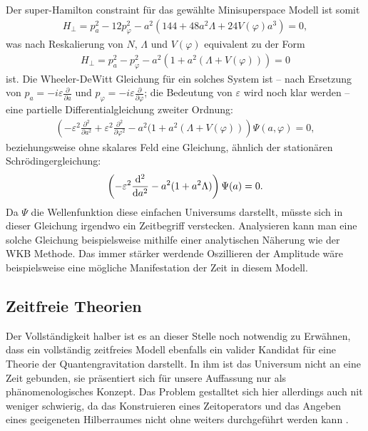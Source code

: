 \documentclass{scrartcl}
\newcommand{\veps}{\varepsilon}
\begin{document}
			Der super-Hamilton constraint für das gewählte Minisuperspace Modell ist somit
			\begin{align}
				H_\perp=p_a^2-12p_\varphi^2-a^2(144+48 a^2 \Lambda+24V(\varphi)a^3)=0,
			\end{align}
			was nach Reskalierung von $N$, $\Lambda$ und $V(\varphi)$ equivalent zu der Form
			\begin{align}
				H_\perp=p_a^2-p_\varphi^2-a^2(1+a^2 (\Lambda+V(\varphi)))=0
			\end{align}
			ist. Die Wheeler-DeWitt Gleichung für ein solches System ist -- nach Ersetzung von $p_a=-i\veps\frac{\partial}{\partial a}$ und $p_\varphi=-i\veps\frac{\partial}{\partial \varphi}$; die Bedeutung von $\veps$ wird noch klar werden -- eine
			partielle Differentialgleichung zweiter Ordnung:
			\begin{align}
				\left(-\veps^2\frac{\partial^2}{\partial a^2}+\veps^2\frac{\partial^2}{\partial \varphi^2}-a^2(1+a^2 (\Lambda+V(\varphi))\right)\Psi(a,\varphi)=0,
			\end{align}
			beziehungsweise ohne skalares Feld eine Gleichung, ähnlich der stationären Schrödingergleichung:
			\begin{align}
				\left(-\veps^2\frac{{\rm d}^2}{{\rm d}a^2}-a^2(1+a^2\Lambda)\right)\Psi(a)=0.
			\end{align}
			Da $\Psi$ die Wellenfunktion diese einfachen Universums darstellt, müsste sich in dieser Gleichung 
			irgendwo ein Zeitbegriff verstecken. Analysieren kann man eine solche Gleichung beispielsweise mithilfe einer
			analytischen Näherung wie der WKB Methode. Das immer stärker werdende Oszillieren der Amplitude wäre
			beispielsweise eine mögliche Manifestation der Zeit in diesem Modell.
		\subsection{Zeitfreie Theorien}
			Der Vollständigkeit halber ist es an dieser Stelle noch notwendig zu Erwähnen,
			dass ein vollständig zeitfreies Modell ebenfalls ein valider Kandidat für eine Theorie der Quantengravitation darstellt. In ihm ist das Universum
			nicht an eine Zeit gebunden, sie präsentiert sich für unsere Auffassung nur als phänomenologisches 
			Konzept. Das Problem gestalltet sich hier allerdings auch nit weniger schwierig,
			da das Konstruieren eines Zeitoperators und das Angeben eines geeigeneten Hilberraumes nicht
			ohne weiters durchgeführt werden kann \cite{qg06}.
	{}
	
\end{document}
